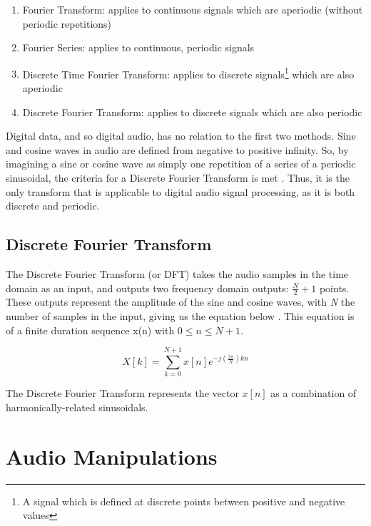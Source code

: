 \begin{enumerate}
    \item Fourier Transform: applies to continuous signals which are aperiodic (without periodic repetitions)
    \item Fourier Series: applies to continuous, periodic signals
    \item Discrete Time Fourier Transform: applies to discrete signals\footnote{A signal which is defined at discrete points between positive and negative values} which are also aperiodic
    \item Discrete Fourier Transform: applies to discrete signals which are also periodic
\end{enumerate}

Digital data, and so digital audio, has no relation to the first two methods. Sine and cosine waves in audio are defined from negative to positive infinity. So, by imagining a sine or cosine wave as simply one repetition of a series of a periodic sinusoidal, the criteria for a Discrete Fourier Transform is met \cite{Zjalic_2021}. Thus, it is the only transform that is applicable to digital audio signal processing, as it is both discrete and periodic.

\subsection{Discrete Fourier Transform}
The Discrete Fourier Transform (or DFT) takes the audio samples in the time domain as an input, and outputs two frequency domain outputs: $\frac{N}{2} + 1$ points. These outputs represent the amplitude of the sine and cosine waves, with \textit{N} the number of samples in the input, giving us the equation below \cite{Gold_Morgan_Ellis_2011}. This equation is of a finite duration sequence x(n)
with $0 \leq n \leq N + 1$.

\begin{equation}\label{eq:dft-equation}
    X[k] = \sum_{k=0}^{N+1}x[n]e^{-j (\frac{2\pi}{N})kn}
\end{equation}

The Discrete Fourier Transform represents the vector $x[n]$ as a combination of harmonically-related sinusoidals. 

\section{Audio Manipulations}